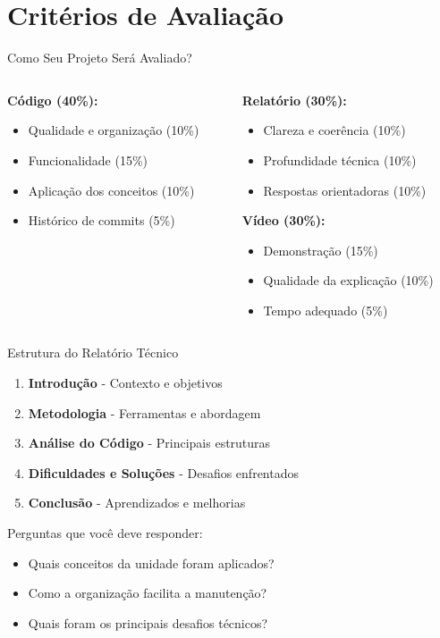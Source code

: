 \documentclass[10pt]{beamer}
\begin{document}
\section{Critérios de Avaliação}

\begin{frame}{Como Seu Projeto Será Avaliado?}
	\begin{columns}
		\begin{column}{0.5\textwidth}
			\textbf{Código (40\%):}
			\begin{itemize}
				\item Qualidade e organização (10\%)
				\item Funcionalidade (15\%)
				\item Aplicação dos conceitos (10\%)
				\item Histórico de commits (5\%)
			\end{itemize}
		\end{column}
		\begin{column}{0.5\textwidth}
			\textbf{Relatório (30\%):}
			\begin{itemize}
				\item Clareza e coerência (10\%)
				\item Profundidade técnica (10\%)
				\item Respostas orientadoras (10\%)
			\end{itemize}
			
			\bigskip
			\textbf{Vídeo (30\%):}
			\begin{itemize}
				\item Demonstração (15\%)
				\item Qualidade da explicação (10\%)
				\item Tempo adequado (5\%)
			\end{itemize}
		\end{column}
	\end{columns}
\end{frame}

\begin{frame}{Estrutura do Relatório Técnico}
	\begin{enumerate}
		\item \textbf{Introdução} - Contexto e objetivos
		\item \textbf{Metodologia} - Ferramentas e abordagem
		\item \textbf{Análise do Código} - Principais estruturas
		\item \textbf{Dificuldades e Soluções} - Desafios enfrentados
		\item \textbf{Conclusão} - Aprendizados e melhorias
	\end{enumerate}
	
	\begin{block}{Perguntas que você deve responder:}
		\begin{itemize}
			\item Quais conceitos da unidade foram aplicados?
			\item Como a organização facilita a manutenção?
			\item Quais foram os principais desafios técnicos?
		\end{itemize}
	\end{block}
\end{frame}
\end{document}
